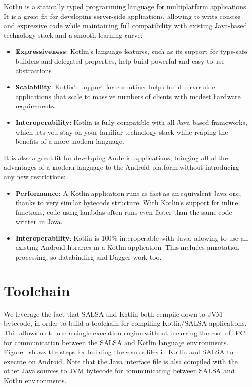 \documentclass[a4paper]{article}
\begin{document}
Kotlin is a statically typed programming language for multiplatform applications. It is a great fit for developing server-side applications, allowing to write concise and expressive code while maintaining full compatibility with existing Java-based technology stack and a smooth learning curve: 
\begin{itemize}
\item \textbf{Expressiveness}: Kotlin's language features, such as its support for type-safe builders and delegated properties, help build powerful and easy-to-use abstractions
\item \textbf{Scalability}: Kotlin's support for coroutines helps build server-side applications that scale to massive numbers of clients with modest hardware requirements.
\item \textbf{Interoperability}: Kotlin is fully compatible with all Java-based frameworks, which lets you stay on your familiar technology stack while reaping the benefits of a more modern language.
\end{itemize}

It is also a great fit for developing Android applications, bringing all of the advantages of a modern language to the Android platform without introducing any new restrictions:
\begin{itemize}
\item \textbf{Performance}: A Kotlin application runs as fast as an equivalent Java one, thanks to very similar bytecode structure. With
Kotlin's support for inline functions, code using lambdas often runs even faster than the same code written in Java.
\item \textbf{Interoperability}: Kotlin is 100\% interoperable with Java, allowing to use all existing Android libraries in a Kotlin application. This includes annotation processing, so databinding and Dagger work too.
\end{itemize}

\section{Toolchain}
We leverage the fact that SALSA and Kotlin both compile down to JVM bytecode, in order to build a toolchain for compiling Kotlin/SALSA applications. This allows us to use a single execution engine without incurring the cost of IPC for communication between the SALSA and Kotlin language environments. Figure~ shows the steps for building the source files in Kotlin and SALSA to execute on Android. Note that the Java interface file is also compiled with the other Java sources to JVM bytecode for communicating between SALSA and Kotlin environments. 
\end{document}
